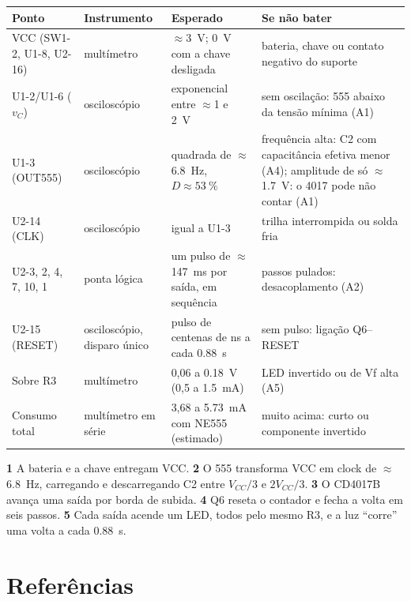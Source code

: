\documentclass[11pt,a4paper]{article}
\begin{document}
\begin{center}
\small
\begin{tabularx}{\linewidth}{@{}L{2.9cm} L{2.2cm} L{4.0cm} Y@{}}
\toprule
\textbf{Ponto} & \textbf{Instrumento} & \textbf{Esperado} & \textbf{Se não bater} \\
\midrule
VCC (SW1-2, U1-8, U2-16) & multímetro & $\approx$\SI{3}{\volt}; \SI{0}{\volt} com a chave desligada & bateria, chave ou contato negativo do suporte \\
U1-2/U1-6 ($v_C$) & osciloscópio & exponencial entre $\approx$1 e \SI{2}{\volt} & sem oscilação: 555 abaixo da tensão mínima (A1) \\
U1-3 (OUT555) & osciloscópio & quadrada de $\approx$\SI{6,8}{\hertz}, $D\approx\SI{53}{\percent}$ & frequência alta: C2 com capacitância efetiva menor (A4); amplitude de só $\approx$\SI{1,7}{\volt}: o 4017 pode não contar (A1) \\
U2-14 (CLK) & osciloscópio & igual a U1-3 & trilha interrompida ou solda fria \\
U2-3, 2, 4, 7, 10, 1 & ponta lógica & um pulso de $\approx$\SI{147}{\milli\second} por saída, em sequência & passos pulados: desacoplamento (A2) \\
U2-15 (RESET) & osciloscópio, disparo único & pulso de centenas de ns a cada \SI{0,88}{\second} & sem pulso: ligação Q6–RESET \\
Sobre R3 & multímetro & 0,06 a \SI{0,18}{\volt} (0,5 a \SI{1,5}{\milli\ampere}) & LED invertido ou de Vf alta (A5) \\
Consumo total & multímetro em série & 3,68 a \SI{5,73}{\milli\ampere} com NE555 (estimado) & muito acima: curto ou componente invertido \\
\bottomrule
\end{tabularx}
\end{center}

\begin{resposta}
\textbf{1} A bateria e a chave entregam VCC. \textbf{2} O 555 transforma VCC em clock
de $\approx$\SI{6,8}{\hertz}, carregando e descarregando C2 entre $V_{CC}/3$ e
$2V_{CC}/3$. \textbf{3} O CD4017B avança uma saída por borda de subida. \textbf{4} Q6
reseta o contador e fecha a volta em seis passos. \textbf{5} Cada saída acende um LED,
todos pelo mesmo R3, e a luz “corre” uma volta a cada \SI{0,88}{\second}.
\end{resposta}

\section*{Referências}
\listaReferencias
\end{document}

